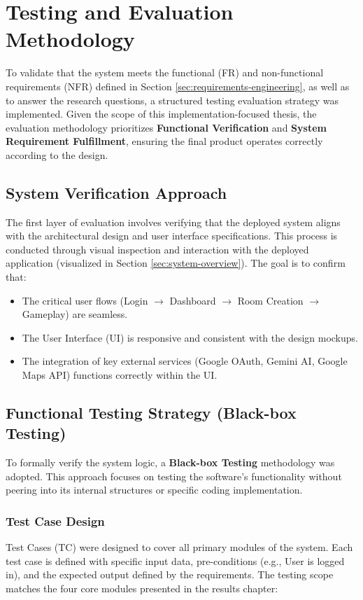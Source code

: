 \section{Testing and Evaluation Methodology}
\label{sec:testing-methodology}

To validate that the system meets the functional (FR) and non-functional requirements (NFR) defined in Section \ref{sec:requirements-engineering}, as well as to answer the research questions, a structured testing evaluation strategy was implemented. Given the scope of this implementation-focused thesis, the evaluation methodology prioritizes \textbf{Functional Verification} and \textbf{System Requirement Fulfillment}, ensuring the final product operates correctly according to the design.

\subsection{System Verification Approach}
The first layer of evaluation involves verifying that the deployed system aligns with the architectural design and user interface specifications. This process is conducted through visual inspection and interaction with the deployed application (visualized in Section \ref{sec:system-overview}). The goal is to confirm that:
\begin{itemize}
    \item The critical user flows (Login $\rightarrow$ Dashboard $\rightarrow$ Room Creation $\rightarrow$ Gameplay) are seamless.
    \item The User Interface (UI) is responsive and consistent with the design mockups.
    \item The integration of key external services (Google OAuth, Gemini AI, Google Maps API) functions correctly within the UI.
\end{itemize}

\subsection{Functional Testing Strategy (Black-box Testing)}
To formally verify the system logic, a \textbf{Black-box Testing} methodology was adopted. This approach focuses on testing the software's functionality without peering into its internal structures or specific coding implementation.

\subsubsection{Test Case Design}
Test Cases (TC) were designed to cover all primary modules of the system. Each test case is defined with specific input data, pre-conditions (e.g., User is logged in), and the expected output defined by the requirements. The testing scope matches the four core modules presented in the results chapter:

